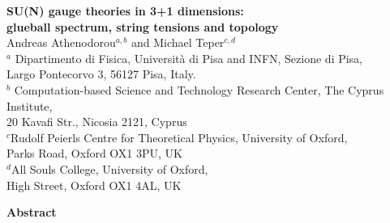 \documentclass[12pt]{article}
\begin{document}
\begin{titlepage}



\begin{center}
  {\large\bf SU(N) gauge theories in 3+1 dimensions: \\
  glueball spectrum, string tensions and topology} \\
  \vspace*{.35in}
{Andreas Athenodorou$^{a,b}$ and Michael Teper$^{c,d}$\\
  \vspace*{.35in}
  $^{a}$ Dipartimento di Fisica, Universit\`a di Pisa and INFN, Sezione di Pisa, \\
  Largo Pontecorvo 3, 56127 Pisa, Italy. \\
\vspace*{.10in}
$^{b}$ Computation-based Science and Technology Research Center, The Cyprus Institute,\\
20 Kavafi Str., Nicosia 2121, Cyprus \\
\vspace*{.10in}
$^{c}$Rudolf Peierls Centre for Theoretical Physics, University of Oxford,\\
Parks Road, Oxford OX1 3PU, UK\\
\vspace*{.10in}
$^{d}$All Souls College, University of Oxford,\\
High Street, Oxford OX1 4AL, UK}
%
\end{center}



\vspace*{0.2in}


\begin{center}
{\bf Abstract}
\end{center}


\end{titlepage}
\end{document}
